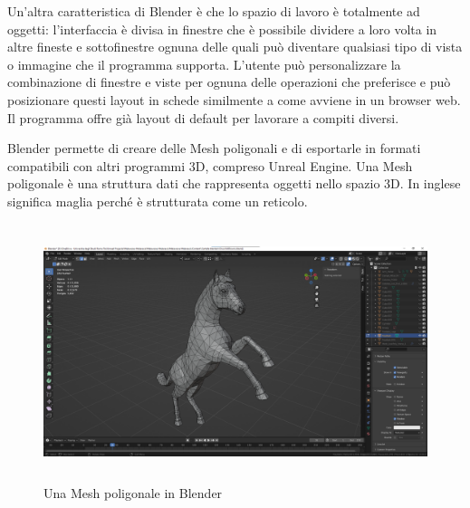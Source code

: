 Un'altra caratteristica di Blender è che lo spazio di lavoro è totalmente ad oggetti: l'interfaccia è divisa in finestre che è possibile dividere a loro volta in altre fineste e sottofinestre ognuna delle quali può diventare qualsiasi tipo di vista o immagine che il programma supporta.
%
L'utente può personalizzare la combinazione di finestre e viste per ognuna delle operazioni che preferisce e può posizionare questi layout in schede similmente a come avviene in un browser web.
%
Il programma offre già layout di default per lavorare a compiti diversi.

Blender permette di creare delle Mesh poligonali e di esportarle in formati compatibili con altri programmi 3D, compreso Unreal Engine. 
%
Una Mesh poligonale è una struttura dati che rappresenta oggetti nello spazio 3D.
%
In inglese significa maglia perché è strutturata come un reticolo. 

\begin{figure}[!ht]
    \centering
    \includegraphics[height=7.5cm]{figure/MeshPoligonale.png}
    \caption{Una Mesh poligonale in Blender}
\end{figure}













